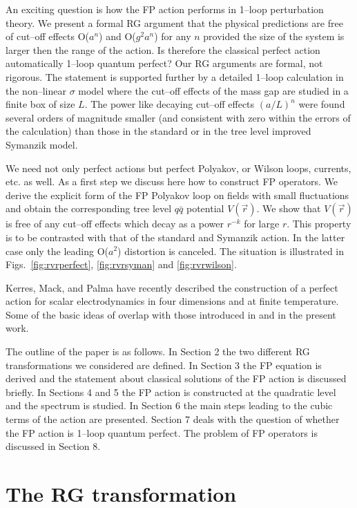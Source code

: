 An exciting question is how the FP action performs in 1--loop
perturbation theory. We present a formal RG argument that the
physical predictions are free of cut--off effects O($a^n$)
and O($g^2 a^n$) for any $n$ provided the size of the system 
is larger then the range of the action.
Is therefore the classical perfect
action automatically 1--loop quantum perfect?
Our RG arguments are formal, not rigorous.
The statement is supported further by a detailed 1--loop
calculation in the non--linear $\sigma$ model \cite{AHNP}
where  the cut--off effects of the mass gap are studied in a finite
box of size $L$. The power like decaying cut--off effects 
$(a/L)^n$ were found
several orders of magnitude smaller (and consistent with zero
within the errors of
the calculation) than those in the standard or
in the tree level improved Symanzik model.

We need not only perfect actions but perfect Polyakov, or Wilson
loops, currents, etc. as well. As a first step we discuss here
how to construct FP operators. We derive the explicit form of the
FP Polyakov loop on fields with small fluctuations and obtain 
the corresponding
tree level $q \bar q$ potential $V(\vec{r})$.
We show that $V(\vec{r})$ is free of any cut--off effects
which decay as a power $r^{-k}$ for large $r$. 
This property is to be contrasted with that of the standard and Symanzik
action. In the latter case  only the leading O($a^2$) distortion 
is canceled. The situation is illustrated in 
Figs.~\ref{fig:rvrperfect},
\ref{fig:rvrsyman} and \ref{fig:rvrwilson}.

Kerres, Mack, and Palma\cite{MACK} have recently described the
construction of a perfect action for scalar electrodynamics in four 
dimensions and at finite temperature.
Some of the basic ideas of \cite{MACK} overlap with those introduced
in \cite{HN} and in the present work.

The outline of the paper is as follows.
In Section 2 the two different RG transformations we considered 
are defined. In Section 3 the FP equation is derived and the
statement about classical solutions of the FP action is discussed
briefly. In Sections 4 and 5 the FP action is constructed at the
quadratic level and the spectrum is studied. In Section 6 the main steps
leading to the cubic terms of the action are presented.
Section 7 deals with
the question of whether the FP action is 1--loop quantum perfect.
The problem of FP operators is discussed in Section 8.

\section{The RG transformation}

